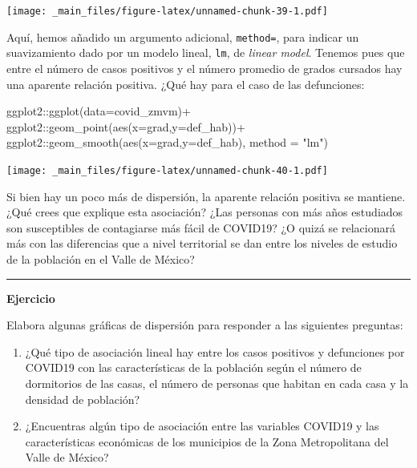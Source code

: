 \documentclass[
  11pt,
  oneside]{book}
\newenvironment{Shaded}{\begin{snugshade}}{\end{snugshade}}
\newcommand{\AttributeTok}[1]{\textcolor[rgb]{0.77,0.63,0.00}{#1}}
\newcommand{\FunctionTok}[1]{\textcolor[rgb]{0.00,0.00,0.00}{#1}}
\newcommand{\NormalTok}[1]{#1}
\newcommand{\SpecialCharTok}[1]{\textcolor[rgb]{0.00,0.00,0.00}{#1}}
\newcommand{\StringTok}[1]{\textcolor[rgb]{0.31,0.60,0.02}{#1}}
\begin{document}
\texttt{[image: \_main\_files/figure-latex/unnamed-chunk-39-1.pdf]}

Aquí, hemos añadido un argumento adicional, \texttt{method=}, para indicar un suavizamiento dado por un modelo lineal, \texttt{lm}, de \emph{linear model}. Tenemos pues que entre el número de casos positivos y el número promedio de grados cursados hay una aparente relación positiva. ¿Qué hay para el caso de las defunciones:

\begin{Shaded}
\begin{Highlighting}[]
\NormalTok{ggplot2}\SpecialCharTok{::}\FunctionTok{ggplot}\NormalTok{(}\AttributeTok{data=}\NormalTok{covid\_zmvm)}\SpecialCharTok{+}
\NormalTok{  ggplot2}\SpecialCharTok{::}\FunctionTok{geom\_point}\NormalTok{(}\FunctionTok{aes}\NormalTok{(}\AttributeTok{x=}\NormalTok{grad,}\AttributeTok{y=}\NormalTok{def\_hab))}\SpecialCharTok{+}
\NormalTok{  ggplot2}\SpecialCharTok{::}\FunctionTok{geom\_smooth}\NormalTok{(}\FunctionTok{aes}\NormalTok{(}\AttributeTok{x=}\NormalTok{grad,}\AttributeTok{y=}\NormalTok{def\_hab), }\AttributeTok{method =} \StringTok{"lm"}\NormalTok{)}
\end{Highlighting}
\end{Shaded}

\texttt{[image: \_main\_files/figure-latex/unnamed-chunk-40-1.pdf]}

Si bien hay un poco más de dispersión, la aparente relación positiva se mantiene. ¿Qué crees que explique esta asociación? ¿Las personas con más años estudiados son susceptibles de contagiarse más fácil de COVID19? ¿O quizá se relacionará más con las diferencias que a nivel territorial se dan entre los niveles de estudio de la población en el Valle de México?

\begin{center}\rule{0.5\linewidth}{0.5pt}\end{center}

\textbf{Ejercicio}

Elabora algunas gráficas de dispersión para responder a las siguientes preguntas:\\

\begin{enumerate}
\def\labelenumi{\roman{enumi})}
\item
  ¿Qué tipo de asociación lineal hay entre los casos positivos y defunciones por COVID19 con las características de la población según el número de dormitorios de las casas, el número de personas que habitan en cada casa y la densidad de población?
\item
  ¿Encuentras algún tipo de asociación entre las variables COVID19 y las características económicas de los municipios de la Zona Metropolitana del Valle de México?
\end{enumerate}
\end{document}
